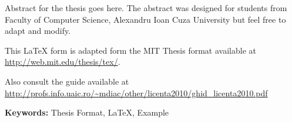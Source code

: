 

Abstract for the thesis goes here. The abstract was designed for students from Faculty of Computer Science, Alexandru Ioan Cuza University but feel free to adapt and modify. 

This LaTeX form is adapted form the MIT Thesis format available at \url{http://web.mit.edu/thesis/tex/}.

Also consult the guide available at \url{http://profs.info.uaic.ro/~mdiac/other/licenta2010/ghid_licenta2010.pdf}

\vspace{0.5cm}

\textbf{Keywords:} Thesis Format, LaTeX, Example
